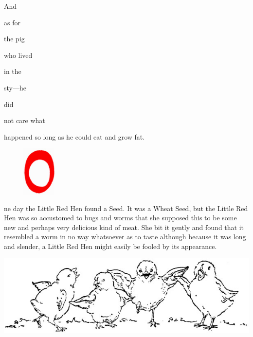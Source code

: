 \documentclass[letterpaper, 10pt, openany]{memoir}
\begin{document}
\vspace{\onelineskip}

And

\vspace{\onelineskip}

as for

\vspace{\onelineskip}

the pig

\vspace{\onelineskip}

who lived

\vspace{\onelineskip}

in the

\vspace{\onelineskip}

sty—he

\vspace{\onelineskip}

did

\vspace{\onelineskip}

not care what

\vspace{\onelineskip}

happened so long as he could eat and grow fat.

\newpage
\begin{figure}
	\includegraphics[width=0.15\textwidth]{image_009_1.jpg}
\end{figure}

ne day the Little Red Hen found a Seed. It was a Wheat Seed, but the Little Red
Hen was so accustomed to bugs and worms that she supposed this to be some new and
perhaps very delicious kind of meat. She bit it gently and found that it resembled
a worm in no way whatsoever as to taste although because it was long and slender, a
Little Red Hen might easily be fooled by its appearance.

\vspace{\onelineskip}

\begin{center}
	\includegraphics[width=\textwidth]{image_009_2.jpg}
\end{center}
\end{document}
